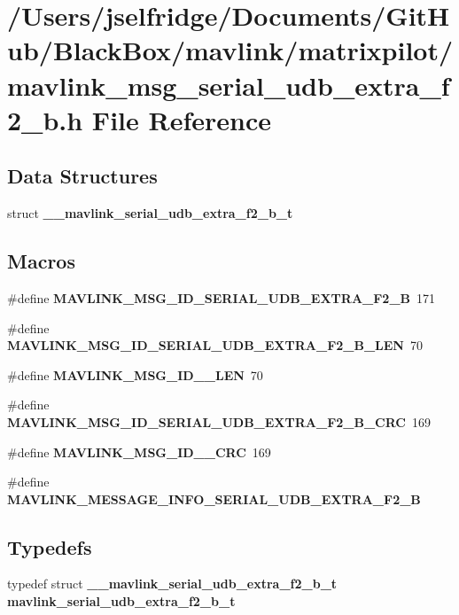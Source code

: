 \section{/\+Users/jselfridge/\+Documents/\+Git\+Hub/\+Black\+Box/mavlink/matrixpilot/mavlink\+\_\+msg\+\_\+serial\+\_\+udb\+\_\+extra\+\_\+f2\+\_\+b.h File Reference}
\label{mavlink__msg__serial__udb__extra__f2__b_8h}
\subsection*{Data Structures}
\begin{DoxyCompactItemize}
\item 
struct \textbf{ \+\_\+\+\_\+mavlink\+\_\+serial\+\_\+udb\+\_\+extra\+\_\+f2\+\_\+b\+\_\+t}
\end{DoxyCompactItemize}
\subsection*{Macros}
\begin{DoxyCompactItemize}
\item 
\#define \textbf{ M\+A\+V\+L\+I\+N\+K\+\_\+\+M\+S\+G\+\_\+\+I\+D\+\_\+\+S\+E\+R\+I\+A\+L\+\_\+\+U\+D\+B\+\_\+\+E\+X\+T\+R\+A\+\_\+\+F2\+\_\+B}~171
\item 
\#define \textbf{ M\+A\+V\+L\+I\+N\+K\+\_\+\+M\+S\+G\+\_\+\+I\+D\+\_\+\+S\+E\+R\+I\+A\+L\+\_\+\+U\+D\+B\+\_\+\+E\+X\+T\+R\+A\+\_\+\+F2\+\_\+\+B\+\_\+\+L\+EN}~70
\item 
\#define \textbf{ M\+A\+V\+L\+I\+N\+K\+\_\+\+M\+S\+G\+\_\+\+I\+D\+\_\+\_\+\+L\+EN}~70
\item 
\#define \textbf{ M\+A\+V\+L\+I\+N\+K\+\_\+\+M\+S\+G\+\_\+\+I\+D\+\_\+\+S\+E\+R\+I\+A\+L\+\_\+\+U\+D\+B\+\_\+\+E\+X\+T\+R\+A\+\_\+\+F2\+\_\+\+B\+\_\+\+C\+RC}~169
\item 
\#define \textbf{ M\+A\+V\+L\+I\+N\+K\+\_\+\+M\+S\+G\+\_\+\+I\+D\+\_\+\_\+\+C\+RC}~169
\item 
\#define \textbf{ M\+A\+V\+L\+I\+N\+K\+\_\+\+M\+E\+S\+S\+A\+G\+E\+\_\+\+I\+N\+F\+O\+\_\+\+S\+E\+R\+I\+A\+L\+\_\+\+U\+D\+B\+\_\+\+E\+X\+T\+R\+A\+\_\+\+F2\+\_\+B}
\end{DoxyCompactItemize}
\subsection*{Typedefs}
\begin{DoxyCompactItemize}
\item 
typedef struct \textbf{ \+\_\+\+\_\+mavlink\+\_\+serial\+\_\+udb\+\_\+extra\+\_\+f2\+\_\+b\+\_\+t} \textbf{ mavlink\+\_\+serial\+\_\+udb\+\_\+extra\+\_\+f2\+\_\+b\+\_\+t}
\end{DoxyCompactItemize}


